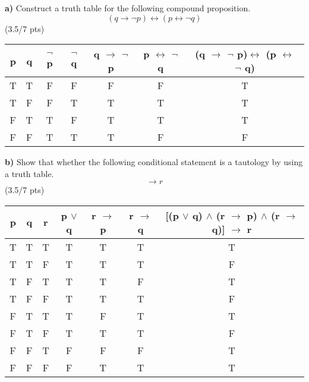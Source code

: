 \documentclass[a4paper,12pt]{article}
\newcommand\tab[1][1cm]{\hspace*{#1}}
\begin{document}
\tab \textbf{a)} Construct a truth table for the following compound proposition.
\begin{equation*}
    (q \rightarrow \neg p)\leftrightarrow (p \leftrightarrow \neg q)
\end{equation*} 
\hfill \small{(3.5/7 pts)} \\
\begin{tcolorbox}
    \begin{center}
        \begin{tabular}{|c|c|c|c|c|c|c|}
            \hline
            p & q & $\neg$ p & $\neg$ q & q $\rightarrow$ $\neg$ p & p $\leftrightarrow$ $\neg$ q & (q $\rightarrow$ $\neg$ p)$\leftrightarrow$ (p $\leftrightarrow$ $\neg$ q)\\
            \hline
            T & T & F & F & F & F & T \\
            T & F & F & T & T & T & T \\
            F & T & T & F & T & T & T \\
            F & F & T & T & T & F & F \\
            \hline
        \end{tabular}
    \end{center}
\end{tcolorbox}
\newpage
\tab \textbf{b)} Show that whether the following conditional statement is a tautology by using a truth table.
\begin{equation*}
    [(p \vee q) \wedge (r \rightarrow p) \wedge (r \rightarrow q)] \rightarrow r
\end{equation*}
\hfill \small{(3.5/7 pts)}\\
\begin{tcolorbox}
    \begin{center}
        \begin{tabular}{|c|c|c|c|c|c|c|}
            \hline
            p & q & r & p $\vee$ q & r $\rightarrow$ p & r $\rightarrow$ q & [(p $\vee$ q) $\wedge$ (r $\rightarrow$ p) $\wedge$ (r $\rightarrow$ q)] $\rightarrow$ r \\
            \hline
            T & T & T & T & T & T & T \\
            T & T & F & T & T & T & F \\
            T & F & T & T & T & F & T \\
            T & F & F & T & T & T & F \\
            F & T & T & T & F & T & T \\
            F & T & F & T & T & T & F \\
            F & F & T & F & F & F & T \\
            F & F & F & F & T & T & T \\
            \hline
        \end{tabular}
    \end{center}
\end{tcolorbox}
\end{document}
